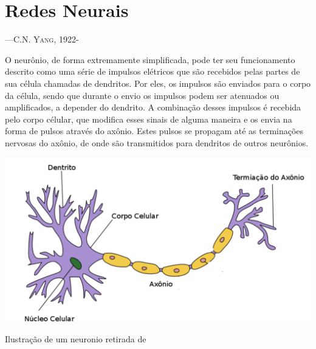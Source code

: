 \chapter{Redes Neurais}
\label{chap:neuro}

\begin{epigraphs}
{\----\textsc{C.N. Yang, 1922- }}
\end{epigraphs}


O neurônio, de forma extremamente simplificada, pode ter seu funcionamento
descrito como uma série de impulsos elétricos que são recebidos pelas
partes de sua célula chamadas de dendritos. Por eles, os impulsos são
enviados para o corpo da célula, sendo que durante o envio os impulsos
podem ser atenuados ou amplificados, a depender do dendrito. A combinação
desses impulsos é recebida pelo corpo célular, que modifica esses sinais
de alguma maneira e os envia na forma de pulsos através do axônio. Estes
pulsos se propagam até as terminações nervosas do axônio, de onde são
transmitidos para dendritos de outros neurônios.
\begin{marginfigure}
    \centering
    \includegraphics[scale = 0.2]{Figures/neuronio}
    \caption{Ilustração de um neuronio retirada de \citep{NeuronWiki}}
\end{marginfigure}

